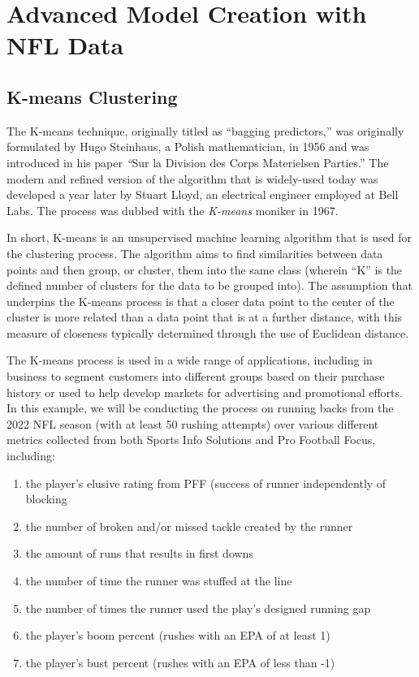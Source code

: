 \documentclass[
  letterpaper,
]{krantz}
\providecommand{\tightlist}{%
  \setlength{\itemsep}{0pt}\setlength{\parskip}{0pt}}\usepackage{longtable,booktabs,array}
\begin{document}
\hypertarget{advanced-model-creation-with-nfl-data}{%
\section{Advanced Model Creation with NFL
Data}\label{advanced-model-creation-with-nfl-data}}

\hypertarget{k-means-clustering}{%
\subsection{K-means Clustering}\label{k-means-clustering}}

The K-means technique, originally titled as ``bagging predictors,'' was
originally formulated by Hugo Steinhaus, a Polish mathematician, in 1956
and was introduced in his paper \emph{``}Sur la Division des Corps
Materielsen Parties.'' The modern and refined version of the algorithm
that is widely-used today was developed a year later by Stuart Lloyd, an
electrical engineer employed at Bell Labs. The process was dubbed with
the \emph{K-means} moniker in 1967.

In short, K-means is an unsupervised machine learning algorithm that is
used for the clustering process. The algorithm aims to find similarities
between data points and then group, or cluster, them into the same class
(wherein ``K'' is the defined number of clusters for the data to be
grouped into). The assumption that underpins the K-means process is that
a closer data point to the center of the cluster is more related than a
data point that is at a further distance, with this measure of closeness
typically determined through the use of Euclidean distance.

The K-means process is used in a wide range of applications, including
in business to segment customers into different groups based on their
purchase history or used to help develop markets for advertising and
promotional efforts. In this example, we will be conducting the process
on running backs from the 2022 NFL season (with at least 50 rushing
attempts) over various different metrics collected from both Sports Info
Solutions and Pro Football Focus, including:

\begin{enumerate}
\def\labelenumi{\arabic{enumi}.}
\tightlist
\item
  the player's elusive rating from PFF (success of runner independently
  of blocking
\item
  the number of broken and/or missed tackle created by the runner
\item
  the amount of runs that results in first downs
\item
  the number of time the runner was stuffed at the line
\item
  the number of times the runner used the play's designed running gap
\item
  the player's boom percent (rushes with an EPA of at least 1)
\item
  the player's bust percent (rushes with an EPA of less than -1)
\end{enumerate}
\end{document}
